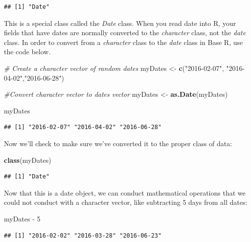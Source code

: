\documentclass[]{book}
\newenvironment{Shaded}{\begin{snugshade}}{\end{snugshade}}
\newcommand{\KeywordTok}[1]{\textcolor[rgb]{0.13,0.29,0.53}{\textbf{{#1}}}}
\newcommand{\DecValTok}[1]{\textcolor[rgb]{0.00,0.00,0.81}{{#1}}}
\newcommand{\StringTok}[1]{\textcolor[rgb]{0.31,0.60,0.02}{{#1}}}
\newcommand{\CommentTok}[1]{\textcolor[rgb]{0.56,0.35,0.01}{\textit{{#1}}}}
\newcommand{\NormalTok}[1]{{#1}}
\begin{document}
\begin{verbatim}
## [1] "Date"
\end{verbatim}

This is a special class called the \emph{Date} class. When you read date
into R, your fields that have dates are normally converted to the
\emph{character} class, not the \emph{date} class. In order to convert
from a \emph{character} class to the \emph{date} class in Base R, use
the code below.

\begin{Shaded}
\begin{Highlighting}[]
\CommentTok{# Create a character vector of random dates}
\NormalTok{myDates <-}\StringTok{ }\KeywordTok{c}\NormalTok{(}\StringTok{"2016-02-07"}\NormalTok{, }\StringTok{"2016-04-02"}\NormalTok{,}\StringTok{"2016-06-28"}\NormalTok{)}

\CommentTok{#Convert character vector to dates vector}
\NormalTok{myDates <-}\StringTok{ }\KeywordTok{as.Date}\NormalTok{(myDates)}

\NormalTok{myDates}
\end{Highlighting}
\end{Shaded}

\begin{verbatim}
## [1] "2016-02-07" "2016-04-02" "2016-06-28"
\end{verbatim}

Now we'll check to make sure we've converted it to the proper class of
data:

\begin{Shaded}
\begin{Highlighting}[]
\KeywordTok{class}\NormalTok{(myDates)}
\end{Highlighting}
\end{Shaded}

\begin{verbatim}
## [1] "Date"
\end{verbatim}

Now that this is a date object, we can conduct mathematical operations
that we could not conduct with a character vector, like subtracting 5
days from all dates:

\begin{Shaded}
\begin{Highlighting}[]
\NormalTok{myDates -}\StringTok{ }\DecValTok{5}
\end{Highlighting}
\end{Shaded}

\begin{verbatim}
## [1] "2016-02-02" "2016-03-28" "2016-06-23"
\end{verbatim}
\end{document}
